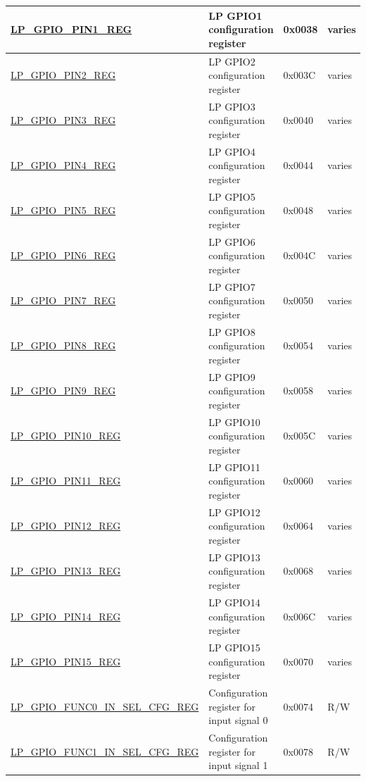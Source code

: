\begin{longtable}{ | p{6.2cm} | p{6.9cm} | p{1.3cm} | p{1.8cm} | }
\hyperref[regdesc:LPGPIOPINNREG]{LP\_GPIO\_PIN1\_REG} & LP GPIO1 configuration register & 0x0038 & varies \\ \hline
\hyperref[regdesc:LPGPIOPINNREG]{LP\_GPIO\_PIN2\_REG} & LP GPIO2 configuration register & 0x003C & varies \\ \hline
\hyperref[regdesc:LPGPIOPINNREG]{LP\_GPIO\_PIN3\_REG} & LP GPIO3 configuration register & 0x0040 & varies \\ \hline
\hyperref[regdesc:LPGPIOPINNREG]{LP\_GPIO\_PIN4\_REG} & LP GPIO4 configuration register & 0x0044 & varies \\ \hline
\hyperref[regdesc:LPGPIOPINNREG]{LP\_GPIO\_PIN5\_REG} & LP GPIO5 configuration register & 0x0048 & varies \\ \hline
\hyperref[regdesc:LPGPIOPINNREG]{LP\_GPIO\_PIN6\_REG} & LP GPIO6 configuration register & 0x004C & varies \\ \hline
\hyperref[regdesc:LPGPIOPINNREG]{LP\_GPIO\_PIN7\_REG} & LP GPIO7 configuration register & 0x0050 & varies \\ \hline
\hyperref[regdesc:LPGPIOPINNREG]{LP\_GPIO\_PIN8\_REG} & LP GPIO8 configuration register & 0x0054 & varies \\ \hline
\hyperref[regdesc:LPGPIOPINNREG]{LP\_GPIO\_PIN9\_REG} & LP GPIO9 configuration register & 0x0058 & varies \\ \hline
\hyperref[regdesc:LPGPIOPINNREG]{LP\_GPIO\_PIN10\_REG} & LP GPIO10 configuration register & 0x005C & varies \\ \hline
\hyperref[regdesc:LPGPIOPINNREG]{LP\_GPIO\_PIN11\_REG} & LP GPIO11 configuration register & 0x0060 & varies \\ \hline
\hyperref[regdesc:LPGPIOPINNREG]{LP\_GPIO\_PIN12\_REG} & LP GPIO12 configuration register & 0x0064 & varies \\ \hline
\hyperref[regdesc:LPGPIOPINNREG]{LP\_GPIO\_PIN13\_REG} & LP GPIO13 configuration register & 0x0068 & varies \\ \hline
\hyperref[regdesc:LPGPIOPINNREG]{LP\_GPIO\_PIN14\_REG} & LP GPIO14 configuration register & 0x006C & varies \\ \hline
\hyperref[regdesc:LPGPIOPINNREG]{LP\_GPIO\_PIN15\_REG} & LP GPIO15 configuration register & 0x0070 & varies \\ \hline
\hyperref[regdesc:LPGPIOFUNCNINSELCFGREG]{LP\_GPIO\_FUNC0\_IN\_SEL\_CFG\_REG} & Configuration register for input signal 0 & 0x0074 & R/W \\ \hline
\hyperref[regdesc:LPGPIOFUNCNINSELCFGREG]{LP\_GPIO\_FUNC1\_IN\_SEL\_CFG\_REG} & Configuration register for input signal 1 & 0x0078 & R/W \\ \hline

\end{longtable}
